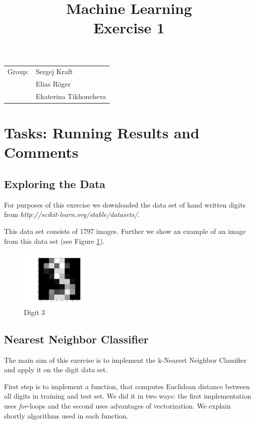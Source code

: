 \documentclass{article}
\title{Machine Learning \\ \bf{Exercise 1} } %
\begin{document}
\maketitle

\begin{center}
\begin{tabular}{l l}
Group: &  Sergej Kraft \\
       & Elias Röger \\
       & Ekaterina Tikhoncheva \\ 
\end{tabular}
\end{center}

\section{Tasks: Running Results and Comments}

\subsection{Exploring the Data}

For purposes of this exercise we downloaded the data set of hand written digits from {\it http://scikit-learn.org/stable/datasets/}.

This data set consists of 1797 images. Further we show an example of an image from this data set (see Figure \ref{fig1}).


\begin{figure}[ht]
	\centering
  	\includegraphics[width=0.33\textwidth]{task1.png}
	\caption{Digit 3}
	\label{fig1}
\end{figure}

\subsection{Nearest Neighbor Classifier}

The main aim of this exercise is to implement the k-Nearest Neighbor Classifier and apply it on the digit data set.

First step is to implement a function, that computes Euclidean distance between all digits in training and test set. We did it in two ways: the first implementation uses {\it for}-loops and the second uses advantages of vectorization. We explain shortly algorithms used in each function.
\end{document}
